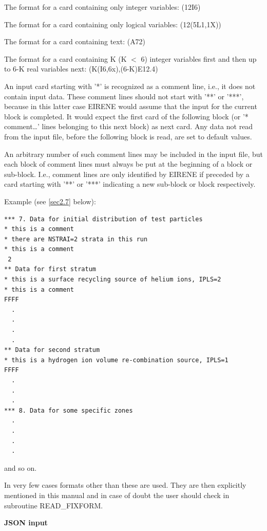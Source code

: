 The format for a card containing only integer variables: (12I6)

The format for a card containing only logical variables: (12(5L1,1X))

The format for a card containing text: (A72) 

The format for a card containing K (K $<$ 6) integer variables first and then
up to 6-K real variables next: (K(I6,6x),(6-K)E12.4) 

An input card starting with '*' is recognized as a comment line, i.e., it does
not contain input data.
These comment lines should not start with  '**' or '***', because in this
latter case EIRENE would assume that the input for the current block is
completed.
It would expect the first card of the following block (or '* comment\dots'
lines belonging to this next block) as next card.
Any data not read from the input file, before the following block is read, are
set to default values.

An arbitrary number of such comment lines may be included in the input file,
but each block of comment lines must always be put at the beginning of a block
or sub-block.
I.e., comment lines are only identified by EIRENE if preceded by a card
starting with '**' or '***' indicating a new sub-block or block respectively.

\medskip

Example (see \cref{sec2.7} below):

\begin{lstlisting}
*** 7. Data for initial distribution of test particles
* this is a comment
* there are NSTRAI=2 strata in this run
* this is a comment
 2
** Data for first stratum
* this is a surface recycling source of helium ions, IPLS=2
* this is a comment
FFFF
  .
  .
  .
  .
** Data for second stratum
* this is a hydrogen ion volume re-combination source, IPLS=1
FFFF
  .
  .
  .
*** 8. Data for some specific zones
  .
  .
  .
  .
\end{lstlisting}

and so on.

\medskip

In very few cases formats other than these are used.
They are then explicitly mentioned in this manual and in case of doubt the user
should check in subroutine READ\_FIXFORM.

\medskip

\medskip

\textbf{JSON input}

\medskip

